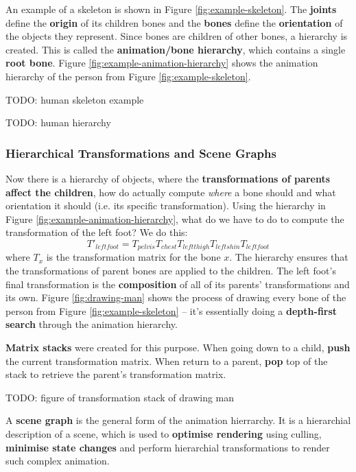 \documentclass{article}
\begin{document}
An example of a skeleton is shown in Figure \ref{fig:example-skeleton}. The \textbf{joints} define the \textbf{origin} of its children bones and the \textbf{bones} define the \textbf{orientation} of the objects they represent. Since bones are children of other bones, a hierarchy is created. This is called the \textbf{animation/bone hierarchy}, which contains a single \textbf{root bone}. Figure \ref{fig:example-animation-hierarchy} shows the animation hierarchy of the person from Figure \ref{fig:example-skeleton}.

TODO: human skeleton example

TODO: human hierarchy

\subsubsection{Hierarchical Transformations and Scene Graphs}

Now there is a hierarchy of objects, where the \textbf{transformations of parents affect the children}, how do actually compute \textit{where} a bone should and what orientation it should (i.e. its specific transformation). Using the hierarchy in Figure \ref{fig:example-animation-hierarchy}, what do we have to do to compute the transformation of the left foot? We do this:
\begin{equation}
	T'_{left foot} = T_{pelvis}T_{chest}T_{left thigh}T_{left shin}T_{left foot}
\end{equation}
where $T_{x}$ is the transformation matrix for the bone $x$. The hierarchy ensures that the transformations of parent bones are applied to the children. The left foot's final transformation is the \textbf{composition} of all of its parents' transformations and its own. Figure \ref{fig:drawing-man} shows the process of drawing every bone of the person from Figure \ref{fig:example-skeleton} -- it's essentially doing a \textbf{depth-first search} through the animation hierarchy.

\textbf{Matrix stacks} were created for this purpose. When going down to a child, \textbf{push} the current transformation matrix. When return to a parent, \textbf{pop} top of the stack to retrieve the parent's transformation matrix.

TODO: figure of transformation stack of drawing man

A \textbf{scene graph} is the general form of the animation hierrarchy. It is a hierarchial description of a scene, which is used to \textbf{optimise rendering} using culling, \textbf{minimise state changes} and perform hierarchial transformations to render such complex animation.
\end{document}
